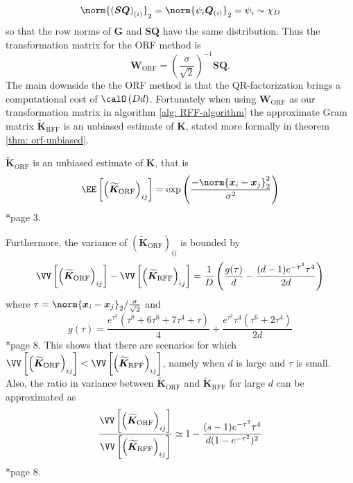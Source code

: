 \[
    \norm{\left(\bm{S} \bm{Q}\right)_{(i)}}_2 = \norm{\psi_i \bm{Q}_{(i)}}_2 = \psi_i \sim \chi_D
\]
so that the row norms of $\bm{G}$ and $\bm{S} \bm{Q}$ have the same distribution. Thus the transformation matrix for the ORF method is
\begin{equation}
    \bm{W}_{\text{ORF}} = \left( \frac{\sigma}{\sqrt{2}} \right)^{-1} \bm{S} \bm{Q}.
\end{equation}
The main downside the the ORF method is that the QR-factorization brings a computational cost of $\calO \left( Dd \right)$. Fortunately when using $\bm{W}_{\text{ORF}}$ as our transformation matrix in algorithm \ref{alg: RFF-algorithm} the approximate Gram matrix $\bm{\widetilde{K}}_{\text{RFF}}$ is an unbiased estimate of $\bm{K}$, stated more formally in theorem \ref{thm: orf-unbiased}.

\begin{thm} \label{thm: orf-unbiased}
    $\bm{\widetilde{K}}_{\text{ORF}}$ is an unbiased estimate of $\bm{K}$, that is
    \[
        \EE \left[ \left( \bm{\widetilde{K}}_{\text{ORF}} \right)_{ij} \right] = \exp \left( \frac{- \norm{\bm{x}_i - {\bm{x}_j}}_{2}^{2}}{\sigma^2} \right)
    \] \cite{YuFelixX2016ORF}*{page 3}.
\end{thm}

Furthermore, the variance of $\left( \bm{\widetilde{K}}_{\text{ORF}} \right)_{ij}$ is bounded by
\[
    \VV \left[ \left( \bm{\widetilde{K}}_{\text{ORF}} \right)_{ij} \right] - \VV \left[ \left( \bm{\widetilde{K}}_{\text{RFF}} \right)_{ij} \right] = \frac{1}{D} \left( \frac{g (\tau)}{d} - \frac{(d-1)e^{-\tau^2}\tau^4}{2d} \right)
\]
where $\tau = \norm{\bm{x}_i - \bm{x}_j}_2 / \frac{\sigma}{\sqrt{2}}$ and
\[
    g (\tau) = \frac{e^{\tau^2} \left( \tau^8 + 6 \tau^6 + 7 \tau^4 + \tau \right)}{4} + \frac{e^{\tau^2} \tau^4 \left( \tau^6 + 2 \tau^4 \right)}{2d}
\]
\cite{LiuFanghui2021RFfK}*{page 8}. This shows that there are scenarios for which $\VV \left[ \left( \bm{\widetilde{K}}_{\text{ORF}} \right)_{ij} \right] < \VV \left[ \left( \bm{\widetilde{K}}_{\text{RFF}} \right)_{ij} \right]$, namely when $d$ is large and $\tau$ is small. Also, the ratio in variance between $\bm{\widetilde{K}}_{\text{ORF}}$ and $\bm{\widetilde{K}}_{\text{RFF}}$ for large $d$ can be approximated as
\[
    \frac{\VV \left[ \left( \bm{\widetilde{K}}_{\text{ORF}} \right)_{ij} \right]}{\VV \left[ \left( \bm{\widetilde{K}}_{\text{RFF}} \right)_{ij} \right]} \simeq 1 - \frac{(s-1)e^{-\tau^2}\tau^4}{d(1-e^{-\tau^2})^2}
\]
\cite{LiuFanghui2021RFfK}*{page 8}.